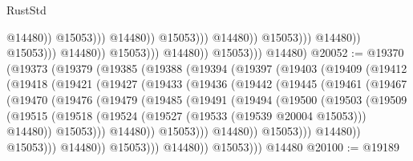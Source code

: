 \begin{lexlean}{RustStd}
\begin{coremodule}
                                                                  @14480))
                                                              @15053)))
                                                        @14480))
                                                    @15053)))
                                              @14480))
                                          @15053)))
                                    @14480))
                                @15053)))
                          @14480))
                      @15053)))
                @14480))
            @15053)))
      @14480)
@20052 := @19370
    (@19373
      (@19379
        (@19385
          (@19388
            (@19394
              (@19397
                (@19403
                  (@19409
                    (@19412
                      (@19418
                        (@19421
                          (@19427
                            (@19433
                              (@19436
                                (@19442
                                  (@19445
                                    (@19461
                                      (@19467
                                        (@19470
                                          (@19476
                                            (@19479
                                              (@19485
                                                (@19491
                                                  (@19494
                                                    (@19500
                                                      (@19503
                                                        (@19509
                                                          (@19515
                                                            (@19518
                                                              (@19524
                                                                (@19527
                                                                  (@19533 (@19539 @20004 @15053)))
                                                                @14480))
                                                            @15053)))
                                                      @14480))
                                                  @15053)))
                                            @14480))
                                        @15053)))
                                  @14480))
                              @15053)))
                        @14480))
                    @15053)))
              @14480))
          @15053)))
    @14480
@20100 := @19189

\end{coremodule}
\end{lexlean}
